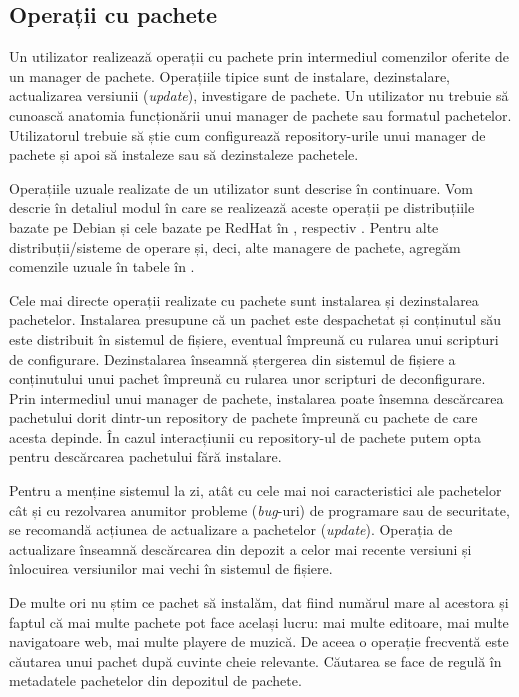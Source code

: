 \subsection{Operații cu pachete}
\label{sec:package:ops}

Un utilizator realizează operații cu pachete prin intermediul comenzilor oferite de un manager de pachete. Operațiile tipice sunt de instalare, dezinstalare, actualizarea versiunii (\textit{update}), investigare de pachete. Un utilizator nu trebuie să cunoască anatomia funcționării unui manager de pachete sau formatul pachetelor. Utilizatorul trebuie să știe cum configurează repository-urile unui manager de pachete și apoi să instaleze sau să dezinstaleze pachetele.

Operațiile uzuale realizate de un utilizator sunt descrise în continuare. Vom descrie în detaliul modul în care se realizează aceste operații pe distribuțiile bazate pe Debian și cele bazate pe RedHat în , respectiv . Pentru alte distribuții/sisteme de operare și, deci, alte managere de pachete, agregăm comenzile uzuale în tabele în .

Cele mai directe operații realizate cu pachete sunt instalarea și dezinstalarea pachetelor. Instalarea presupune că un pachet este despachetat și conținutul său este distribuit în sistemul de fișiere, eventual împreună cu rularea unui scripturi de configurare. Dezinstalarea înseamnă ștergerea din sistemul de fișiere a conținutului unui pachet împreună cu rularea unor scripturi de deconfigurare. Prin intermediul unui manager de pachete, instalarea poate însemna descărcarea pachetului dorit dintr-un repository de pachete împreună cu pachete de care acesta depinde. În cazul interacțiunii cu repository-ul de pachete putem opta pentru descărcarea pachetului fără instalare.

Pentru a menține sistemul la zi, atât cu cele mai noi caracteristici ale pachetelor cât și cu rezolvarea anumitor probleme (\textit{bug}-uri) de programare sau de securitate, se recomandă acțiunea de actualizare a pachetelor (\textit{update}). Operația de actualizare înseamnă descărcarea din depozit a celor mai recente versiuni și înlocuirea versiunilor mai vechi în sistemul de fișiere.

De multe ori nu știm ce pachet să instalăm, dat fiind numărul mare al acestora și faptul că mai multe pachete pot face același lucru: mai multe editoare, mai multe navigatoare web, mai multe playere de muzică. De aceea o operație frecventă este căutarea unui pachet după cuvinte cheie relevante. Căutarea se face de regulă în metadatele pachetelor din depozitul de pachete.

